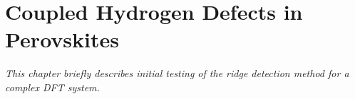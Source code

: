 \chapter{Coupled Hydrogen Defects in Perovskites}
\label{chap:perovskites}

\textit{This chapter briefly describes initial testing of the ridge detection method for a complex DFT system.}




